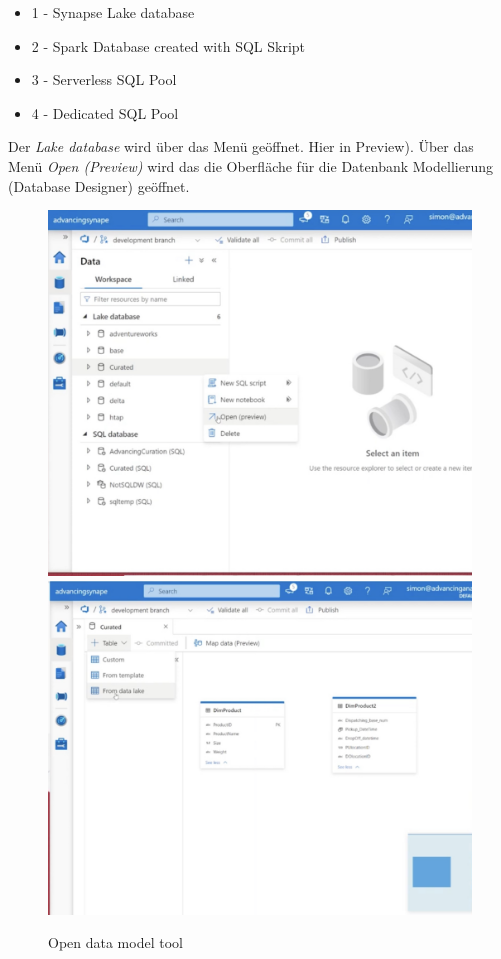 \begin{itemize}
	\item 1 - Synapse Lake database
	\item 2 - Spark Database created with \gls{SQL} Skript
	\item 3 - Serverless \gls{SQL} Pool
	\item 4 - Dedicated \gls{SQL} Pool
\end{itemize}

Der \textit{Lake database} wird über das Menü geöffnet. Hier in Preview). Über das Menü \textit{Open (Preview)} wird das die Oberfläche für die Datenbank Modellierung (Database Designer) geöffnet.

\begin{figure}[H]
	\centering
	\includegraphics[scale = 0.2]{attachment/chapter_2/Scc140}
		\includegraphics[scale = 0.2]{attachment/chapter_2/Scc142}
	\caption{Open data model tool} 
\end{figure}

